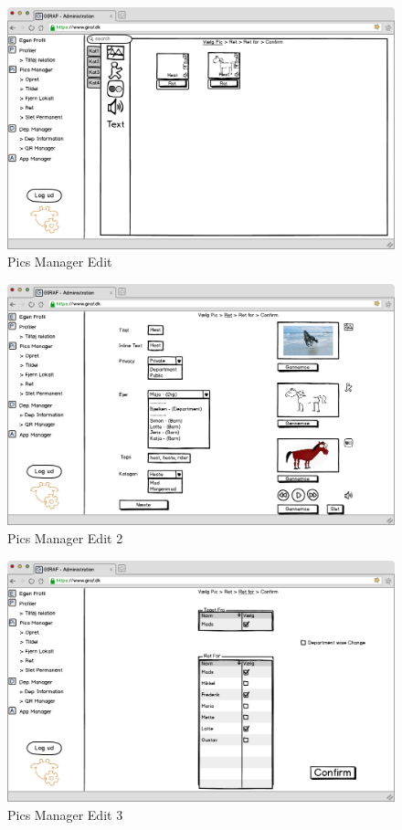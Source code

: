 \begin{figure}[p]
\centering
\includegraphics[width=1\textwidth]{images/mockup/picsManagerEdit.png}
\caption{Pics Manager Edit}
\label{fig:pics_manager_edit}
\end{figure}

\newpage

\begin{figure}[p]
\centering
\includegraphics[width=1\textwidth]{images/mockup/picsManagerEdit2.png}
\caption{Pics Manager Edit 2}
\label{fig:pics_manager_edit2}
\end{figure}

\FloatBarrier

\begin{figure}[p]
\centering
\includegraphics[width=1\textwidth]{images/mockup/picsManagerEdit3.png}
\caption{Pics Manager Edit 3}
\label{fig:pics_manager_edit3}
\end{figure}

